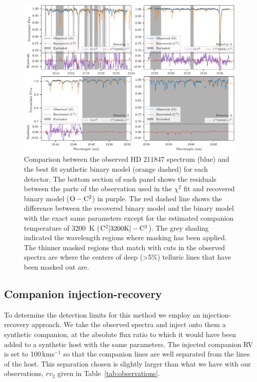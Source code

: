 \documentclass[fleqn,usenatbib]{mnras}
\newcommand{\kmps}{\,kms\(^{-1}\)}	%
\begin{document}
\begin{figure}
    \centering
    \includegraphics[width=0.9\linewidth]{images/visualize_result_residuals.pdf}
    \caption{Comparison between the observed {HD 211847} spectrum (blue) and the best fit synthetic binary model (orange dashed) for each detector. The bottom section of each panel shows the residuals between the parts of the observation used in the \(\chi^2\) fit and recovered binary model (\(\rm O-C^2\)) in purple. The red dashed line shows the difference between the recovered binary model and the binary model with the exact same parameters except for the estimated companion temperature of 3200~K (\(\rm C^2[3200K]- C^2\)). The grey shading indicated the wavelength regions where masking has been applied. The thinner masked regions that match with cuts in the observed spectra are where the centers of deep (>5\%) telluric lines that have been masked out are.}
    \label{fig:visualinspection-hd2118471}
\end{figure}


\subsection{Companion injection-recovery}
\label{subsection:injection-recovery}
To determine the detection limits for this method we employ an injection-recovery approach. We take the observed spectra and inject onto them a synthetic companion, at the absolute flux ratio to which it would have been added to a synthetic host with the same parameters. The injected companion RV is set to 100\kmps{} so that the companion lines are well separated from the lines of the host. This separation chosen is slightly larger than what we have with our observations, \(rv_2\) given in Table~\ref{tab:observations}.
\end{document}
